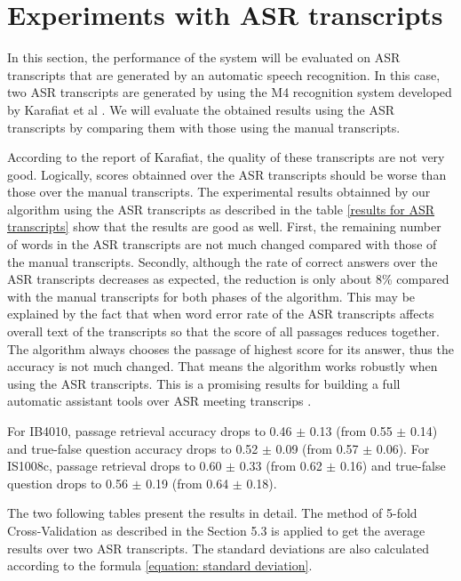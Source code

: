 \section{Experiments with ASR transcripts}

In this section, the performance of the system will be evaluated on ASR transcripts that are generated by an automatic speech recognition. In this case, two ASR transcripts are generated by using the M4 recognition system developed by Karafiat et al \cite{ASR_transcrips}. We will evaluate the obtained results using the ASR transcripts by comparing them with those using the manual transcripts.

According to the report of Karafiat, the quality  of these transcripts are not very good. Logically, scores obtainned over the ASR transcripts should be worse than those over the manual transcripts. The experimental results obtainned by our algorithm using the ASR transcripts as described in the table \ref{results for ASR transcripts} show that the results are good as well. First, the remaining number of words in the ASR transcripts are not much changed compared with those of the manual transcripts. Secondly, although the rate of correct answers over the ASR transcripts decreases as expected, the reduction is only about 8\% compared with the manual transcripts for both phases of the algorithm. This may be explained by the fact that when word error rate of the ASR transcripts affects overall text of the transcripts so that the score of all passages reduces together. The algorithm always chooses the passage of highest score for its answer, thus the accuracy is not much changed. That means the algorithm works robustly when using the ASR transcripts. This is a promising results for building a full automatic assistant tools over ASR meeting transcrips \cite{lequocanh1}. 

For IB4010, passage retrieval accuracy drops to 0.46 \ensuremath{\pm} 0.13 (from 0.55 \ensuremath{\pm} 0.14) and true-false question accuracy drops to 0.52 \ensuremath{\pm} 0.09 (from 0.57 \ensuremath{\pm} 0.06). For IS1008c, passage retrieval drops to 0.60 \ensuremath{\pm} 0.33 (from 0.62 \ensuremath{\pm} 0.16) and true-false question drops to 0.56 \ensuremath{\pm} 0.19 (from 0.64 \ensuremath{\pm} 0.18).

The two following tables present the results in detail. The method of 5-fold Cross-Validation as described in the Section 5.3 is applied to get the average results over two ASR transcripts. The standard deviations are also calculated according to the formula \ref{equation: standard deviation}.

